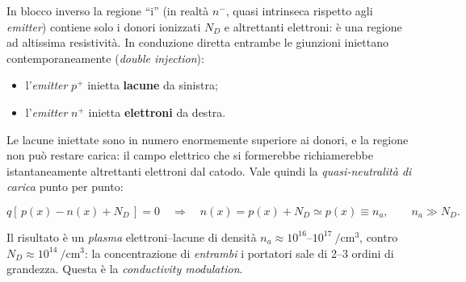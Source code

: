 \documentclass[11pt,a4paper]{article}
\begin{document}
In blocco inverso la regione ``i'' (in realtà $n^{-}$, quasi intrinseca rispetto
agli \emph{emitter}) contiene solo i donori ionizzati $N_D$ e altrettanti
elettroni: è una regione ad altissima resistività. In conduzione diretta
entrambe le giunzioni iniettano contemporaneamente
(\emph{double injection}):

\begin{itemize}
\item l'\emph{emitter} $p^{+}$ inietta \textbf{lacune} da sinistra;
\item l'\emph{emitter} $n^{+}$ inietta \textbf{elettroni} da destra.
\end{itemize}

Le lacune iniettate sono in numero enormemente superiore ai donori, e la
regione non può restare carica: il campo elettrico che si formerebbe richiamerebbe
istantaneamente altrettanti elettroni dal catodo. Vale quindi la
\emph{quasi-neutralità di carica} punto per punto:

\begin{equation}
q\left[\,p(x) - n(x) + N_D\,\right] = 0
\quad\Longrightarrow\quad
n(x) = p(x) + N_D \simeq p(x) \equiv n_a ,
\qquad n_a \gg N_D .
\label{eq:neutralita}
\end{equation}

Il risultato è un \emph{plasma} elettroni--lacune di densità
$n_a \approx 10^{16}$--$10^{17}\ \si{\per\centi\meter\cubed}$, contro
$N_D \approx 10^{14}\ \si{\per\centi\meter\cubed}$: la concentrazione di
\emph{entrambi} i portatori sale di 2--3 ordini di grandezza. Questa è la
\emph{conductivity modulation}.
\end{document}
